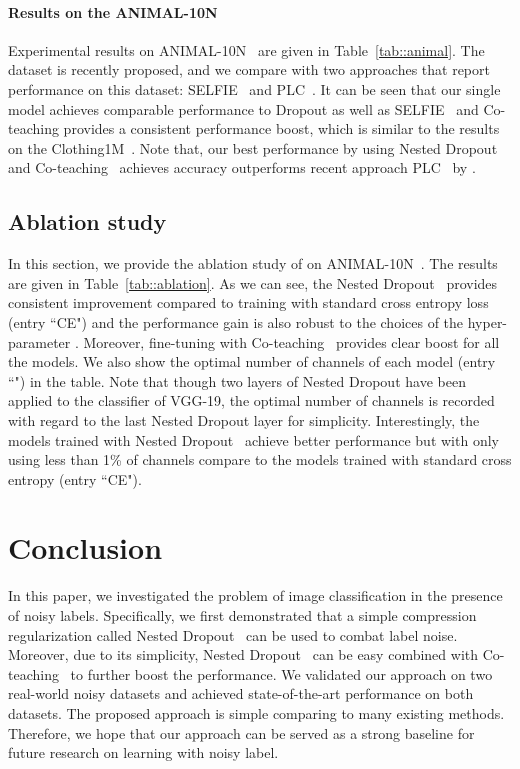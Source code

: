 \documentclass[final]{cvpr}
\begin{document}
\vspace{-2mm}
\paragraph{Results on the ANIMAL-10N~\cite{xiao2015learning}} 
Experimental results on ANIMAL-10N~\cite{xiao2015learning} are given in Table~\ref{tab::animal}. 
The dataset is recently proposed, and we compare with two approaches that report performance on this dataset: SELFIE~\cite{song2019selfie} and  PLC~\cite{zhang2021learning}. 
It can be seen that our single model achieves comparable performance to Dropout as well as SELFIE~\cite{song2019selfie} and Co-teaching provides a consistent performance boost, which is similar to the results on the Clothing1M~\cite{xiao2015learning}. 
Note that, our best performance by using Nested Dropout~\cite{rippel2014learning} and Co-teaching~\cite{han2018co} achieves  accuracy outperforms recent approach PLC~\cite{zhang2021learning} by . 



\subsection{Ablation study}
\label{sec::ablation}
In this section, we provide the ablation study of  on ANIMAL-10N~\cite{song2019selfie}. 
The results are given in Table~\ref{tab::ablation}. 
As we can see, the Nested Dropout~\cite{rippel2014learning} provides consistent improvement compared to training with standard cross entropy loss (entry ``CE") and the performance gain is also robust to the choices of the hyper-parameter . 
Moreover, fine-tuning with Co-teaching~\cite{han2018co} provides clear boost for all the models. 
We also show the optimal number of channels of each model (entry ``") in the table. 
Note that though two layers of Nested Dropout have been applied to the classifier of VGG-19, the optimal number of channels  is recorded with regard to the last Nested Dropout layer for simplicity.
Interestingly, the models trained with Nested Dropout~\cite{rippel2014learning} achieve better performance but with only using less than 1\% of channels compare to the models trained with standard cross entropy (entry ``CE").
 


\section{Conclusion}
In this paper, we investigated the problem of image classification in the presence of noisy labels.
Specifically, we first demonstrated that a simple compression regularization called Nested Dropout~\cite{rippel2014learning}
can be used to combat label noise.
Moreover, due to its simplicity, Nested Dropout~\cite{rippel2014learning} can be easy combined with Co-teaching~\cite{han2018co} to further boost the performance. We validated our approach on two real-world noisy datasets and achieved state-of-the-art performance on both datasets. The proposed approach is simple comparing to many existing methods. 
Therefore, we hope that our approach can be served as a strong baseline for future research on learning with noisy label.
\end{document}
